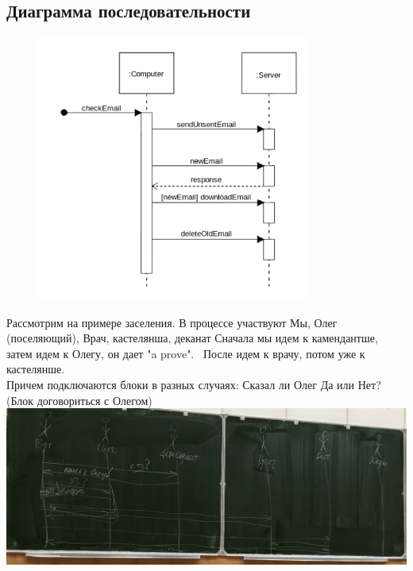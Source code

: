 \documentclass[12pt; a4paper]{book}
\theoremstyle{plain} %
\theoremstyle{defenition}
\theoremstyle{remark}
\begin{document}
\subsection{Диаграмма последовательности}
\begin{figure}[!hbp]
\includegraphics[angle=0, width=0.8\textwidth]{IMG/3} \\
\end{figure}
Рассмотрим на примере заселения.  В процессе участвуют Мы, Олег (поселяющий), Врач, кастелянша, деканат
Сначала мы идем к камендантше, затем идем к Олегу, он дает "a prove".  После идем к врачу, потом уже  к кастелянше.\\
Причем подключаются блоки в разных случаях: Сказал ли Олег Да или Нет? (Блок договориться с Олегом)\\
\includegraphics[angle=0, width=\textwidth]{IMG/IMG_0818.jpg} \\
\newpage
\end{document}
